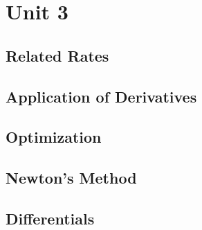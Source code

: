 \chapter{Unit 3}
\section{Related Rates}
\section{Application of Derivatives}
\section{Optimization}
\section{Newton's Method}
\section{Differentials}
